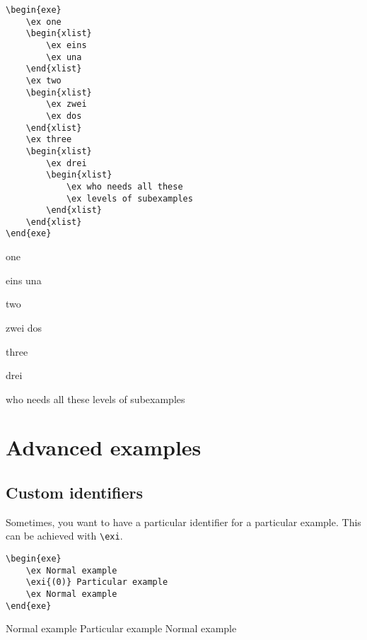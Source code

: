 \documentclass[output=paper]{langscibook}
\newcommand{\cmd}[1]{\texttt{\textbackslash#1}}
\begin{document}
\begin{minipage}{.55\textwidth}
\begin{lstlisting}
\begin{exe}
    \ex one
    \begin{xlist}
        \ex eins
        \ex una
    \end{xlist}
    \ex two
    \begin{xlist}
        \ex zwei
        \ex dos
    \end{xlist}    
    \ex three
    \begin{xlist}
        \ex drei        
        \begin{xlist}
            \ex who needs all these
            \ex levels of subexamples
        \end{xlist}
    \end{xlist}
\end{exe}
 \end{lstlisting}
\end{minipage}
\parbox{.45\textwidth}{
\begin{exe}
    \ex one
    \begin{xlist}
        \ex eins
        \ex una
    \end{xlist}
    \ex two
    \begin{xlist}
        \ex zwei
        \ex dos
    \end{xlist}    
    \ex three
    \begin{xlist}
        \ex drei        
        \begin{xlist}
            \ex who needs all these
            \ex levels of subexamples
        \end{xlist}
    \end{xlist}
\end{exe}
}




\section{Advanced examples}
\subsection{Custom identifiers}
Sometimes, you want to have a particular identifier for a particular example. This can be achieved with \cmd{exi}.

\begin{minipage}{.55\textwidth}
\begin{lstlisting}
\begin{exe}
    \ex Normal example
    \exi{(0)} Particular example
    \ex Normal example
\end{exe}
 \end{lstlisting}
\end{minipage}
\parbox{.45\textwidth}{
\begin{exe}
    \ex Normal example
     Particular example
    \ex Normal example
\end{exe}
}
\end{document}

